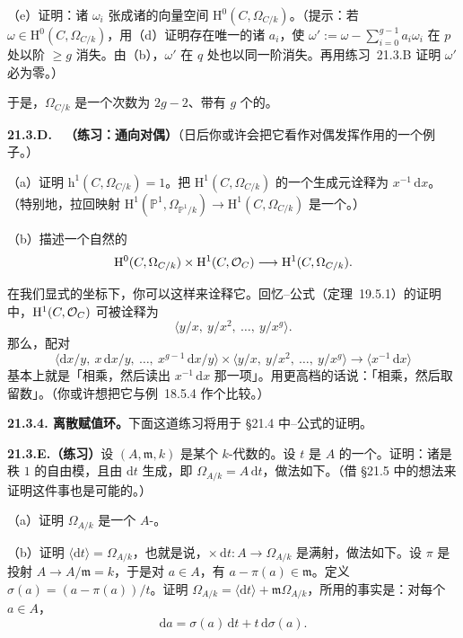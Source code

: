 （e）证明：诸 $\omega_i$ 张成诸\trDifferential{}的向量空间 $\mathrm{H}^0(C,\Omega_{C/k})$。（提示：若 $\omega\in\mathrm{H}^0(C,\Omega_{C/k})$，用（d）证明存在唯一的诸 $a_i$，使 $\omega':=\omega-\sum_{i=0}^{g-1}a_i\omega_i$ 在 $p$ 处以阶 $\ge g$ 消失。由（b），$\omega'$ 在 $q$ 处也以同一阶消失。再用\mbox{练习~21.3.B} 证明 $\omega'$ 必为零。）

于是，$\Omega_{C/k}$ 是一个次数为 $2g-2$、带有 $g$ 个\trSection{}的\trInvertibleSheaf。

\textbf{21.3.D.}\ \hard\ \textbf{（练习：通向\trSerre{}对偶）}\quad （日后你或许会把它看作\trSerre{}对偶发挥作用的一个例子。）

（a）证明 $\mathrm{h}^1(C,\Omega_{C/k})=1$。把 $\mathrm{H}^1(C,\Omega_{C/k})$ 的一个生成元诠释为 $x^{-1}\,\mathrm{d}x$。（特别地，拉回映射 $\mathrm{H}^1(\mathbb{P}^1,\Omega_{\mathbb{P}^1/k})\to\mathrm{H}^1(C,\Omega_{C/k})$ 是一个\trIsomorphism。）

（b）描述一个自然的\trPerfectPairing
\[
\mathrm{H}^0(C,\Omega_{C/k})\times\mathrm{H}^1(C,\mathcal{O}_C)\longrightarrow\mathrm{H}^1(C,\Omega_{C/k}).
\]

在我们显式的坐标下，你可以这样来诠释它。回忆\trHyperelliptic{}\trRiemann--\trHurwitz{}公式（\mbox{定理~19.5.1}）的证明中，$\mathrm{H}^1(C,\mathcal{O}_C)$ 可被诠释为
\[
\langle y/x,\ y/x^2,\ \dots,\ y/x^g\rangle.
\]
那么，配对
\[
\langle \mathrm{d}x/y,\ x\,\mathrm{d}x/y,\ \dots,\ x^{g-1}\,\mathrm{d}x/y\rangle\times\langle y/x,\ y/x^2,\ \dots,\ y/x^g\rangle\longrightarrow\langle x^{-1}\,\mathrm{d}x\rangle
\]
基本上就是「相乘，然后读出 $x^{-1}\,\mathrm{d}x$ 那一项」。用更高档的话说：「相乘，然后取留数」。（你或许想把它与\mbox{例~18.5.4} 作个比较。）

\textbf{21.3.4. 离散赋值环。}\quad 下面这道练习将用于 \S21.4 中\trRiemann--\trHurwitz{}公式的证明。

\textbf{21.3.E.（练习）}\quad 设\trDVR{} $(A,\mathfrak{m},k)$ 是某个\trFinitelyGenerated{} $k$-代数的\trLocalization。设 $t$ 是 $A$ 的一个\trUniformizer。证明：诸\trDifferential{}是秩 $1$ 的自由模，且由 $\mathrm{d}t$ 生成，即 $\Omega_{A/k}=A\,\mathrm{d}t$，做法如下。（借 \S21.5 中的想法来证明这件事也是可能的。）

（a）证明 $\Omega_{A/k}$ 是一个\trFinitelyGenerated{} $A$-\trModule。

（b）证明 $\langle\mathrm{d}t\rangle=\Omega_{A/k}$，也就是说，$\times\,\mathrm{d}t\colon A\to\Omega_{A/k}$ 是满射，做法如下。设 $\pi$ 是投射 $A\to A/\mathfrak{m}=k$，于是对 $a\in A$，有 $a-\pi(a)\in\mathfrak{m}$。定义 $\sigma(a)=(a-\pi(a))/t$。证明 $\Omega_{A/k}=\langle\mathrm{d}t\rangle+\mathfrak{m}\Omega_{A/k}$，所用的事实是：对每个 $a\in A$，
\[
\mathrm{d}a=\sigma(a)\,\mathrm{d}t+t\,\mathrm{d}\sigma(a).
\]

